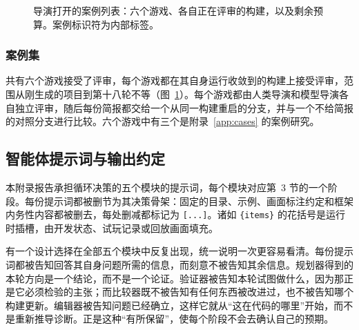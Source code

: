 \begin{figure}[t]
\centering
{}
\caption{导演打开的案例列表：六个游戏、各自正在评审的构建，以及剩余预算。案例标识符为内部标签。}
\label{fig:caselist}
\end{figure}

\subsubsection{案例集}
共有六个游戏接受了评审，每个游戏都在其自身运行收敛到的构建上接受评审，范围从刚生成的项目到第十八轮不等（图~\ref{fig:caselist}）。每个游戏都由人类导演和模型导演各自独立评审，随后每份简报都交给一个从同一构建重启的分支，并与一个不给简报的对照分支进行比较。六个游戏中有三个是附录~\ref{app:cases} 的案例研究。

\subsection{智能体提示词与输出约定}\label{app:prompts}
本附录报告承担循环决策的五个模块的提示词，每个模块对应第~3 节的一个阶段。每份提示词都被删节为其决策骨架：固定的目录、示例、画面标注约定和框架内务性内容都被删去，每处删减都标记为 \texttt{[...]}。诸如 \texttt{\{items\}} 的花括号是运行时插槽，由开发状态、试玩记录或回放画面填充。

有一个设计选择在全部五个模块中反复出现，统一说明一次更容易看清。每份提示词都被告知回答其自身问题所需的信息，而刻意不被告知其余信息。规划器得到的本轮方向是一个结论，而不是一个论证。验证器被告知本轮试图做什么，因为那正是它必须检验的主张；而比较器既不被告知有任何东西被改进过，也不被告知哪个构建更新。编辑器被告知问题已经确立，这样它就从“这在代码的哪里”开始，而不是重新推导诊断。正是这种“有所保留”，使每个阶段不会去确认自己的预期。

